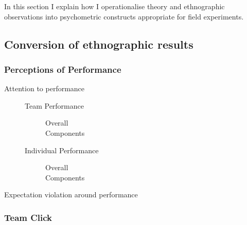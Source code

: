 In this section I explain how I operationalise theory and ethnographic observations into psychometric constructs appropriate for field experiments.

\subsection{Conversion of ethnographic results}

      \subsubsection{Perceptions of Performance}


                    \begin{description}
                      \item [Attention to performance]
                        \begin{description}
                          \item [Team Performance]
                            \begin{description}
                              \item [Overall]
                              \item [Components]
                            \end{description}
                          \item [Individual Performance]
                          \begin{description}
                            \item [Overall]
                            \item [Components]
                          \end{description}
                        \end{description}
                        \item [Expectation violation around performance]
                    \end{description}





      \subsubsection{Team Click}

